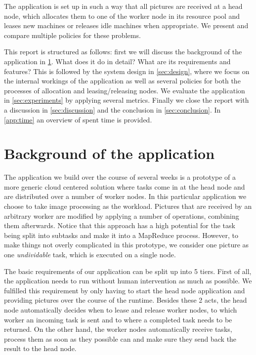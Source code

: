 \documentclass{stylesheet}
\begin{document}
The application is set up in such a way that all pictures are received at a head node, which allocates them to one of the worker node in its resource pool and leases new machines or releases idle machines when appropriate. We present and compare multiple policies for these problems.

This report is structured as follows: first we will discuss the background of the application in \cref{sec:background}. What does it do in detail? What are its requirements and features? This is followed by the system design in \cref{sec:design}, where we focus on the internal workings of the application as well as several policies for both the processes of allocation and leasing/releasing nodes. We evaluate the application in \cref{sec:experiments} by applying several metrics. Finally we close the report with a discussion in \cref{sec:discussion} and the conclusion in \cref{sec:conclusion}. In \cref{app:time} an overview of spent time is provided.

\section{Background of the application}
\label{sec:background}
The application we build over the course of several weeks is a prototype of a more generic cloud centered solution where tasks come in at the head node and are distributed over a number of worker nodes. In this particular application we choose to take image processing as the workload. Pictures that are received by an arbitrary worker are modified by applying a number of operations, combining them afterwards. Notice that this approach has a high potential for the task being split into subtasks and make it into a MapReduce process. However, to make things not overly complicated in this prototype, we consider one picture as one \textit{undividable} task, which is executed on a single node.

The basic requirements of our application can be split up into 5 tiers. First of all, the application needs to run without human intervention as much as possible. We fulfilled this requirement by only having to start the head node application and providing pictures over the course of the runtime. Besides these 2 acts, the head node automatically decides when to lease and release worker nodes, to which worker an incoming task is sent and to where a completed task needs to be returned. On the other hand, the worker nodes automatically receive tasks, process them as soon as they possible can and make sure they send back the result to the head node.
\end{document}
